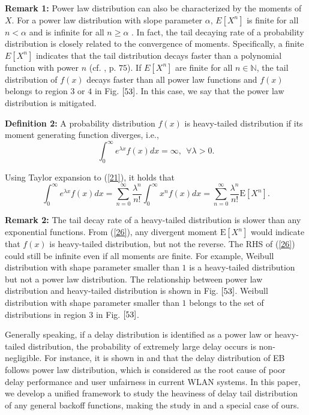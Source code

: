 \documentclass[journal]{IEEEtran}
\begin{document}
\textbf{Remark 1:} Power law distribution can also be characterized by the moments of $X$. For a power law distribution with slope parameter $\alpha$, $E\left[X^n\right]$ is finite for all $n<\alpha$ and is infinite for all $n\geq\alpha$ \cite{2009:Cho}. In fact, the tail decaying rate of a probability distribution is closely related to the convergence of moments. Specifically, a finite $E\left[X^n\right]$ indicates that the tail distribution decays faster than a polynomial function with power $n$ (cf. \cite{2005:Gut}, p. $75$). If $E\left[X^n\right]$ are finite for all $n\in \mathbb{N}$, the tail distribution of $f(x)$ decays faster than all power law functions and $f(x)$ belongs to region $3$ or $4$ in Fig. $\ref{53}$. In this case, we say that the power law distribution is mitigated.

\textbf{Definition 2:} A probability distribution $f(x)$ is heavy-tailed distribution if its moment generating function diverges, i.e.,
\begin{equation}
\label{21}
\int_0^{\infty} e^{\lambda x}f(x)dx=\infty,\ \  \forall \lambda>0.
\end{equation}

Using Taylor expansion to (\ref{21}), it holds that
\begin{equation}
\label{26}
\int_0^{\infty} e^{\lambda x}f(x)dx = \sum_{n=0}^{\infty} \frac{\lambda^n}{n!}\int_{0}^{\infty} x^n f(x) dx = \sum_{n=0}^{\infty} \frac{\lambda^n}{n!}\text{E}\left[X^n\right].
\end{equation}

\textbf{Remark 2:} The tail decay rate of a heavy-tailed distribution is slower than any exponential functions. From (\ref{26}), any divergent moment $\text{E}\left[X^n\right]$ would indicate that $f(x)$ is heavy-tailed distribution, but not the reverse. The RHS of (\ref{26}) could still be infinite even if all moments are finite. For example, Weibull distribution with shape parameter smaller than $1$ is a heavy-tailed distribution but not a power law distribution. The relationship between power law distribution and heavy-tailed distribution is shown in Fig. $\ref{53}$. Weibull distribution with shape parameter smaller than $1$ belongs to the set of distributions in region $3$ in Fig. $\ref{53}$.

Generally speaking, if a delay distribution is identified as a power law or heavy-tailed distribution, the probability of extremely large delay occurs is non-negligible. For instance, it is shown in \cite{2009:Cho} and \cite{2007:Sakurai} that the delay distribution of EB follows power law distribution, which is considered as the root cause of poor delay performance and user unfairness in current WLAN systems. In this paper, we develop a unified framework to study the heaviness of delay tail distribution of any general backoff functions, making the study in \cite{2009:Cho} and \cite{2007:Sakurai} a special case of ours.
\end{document}
